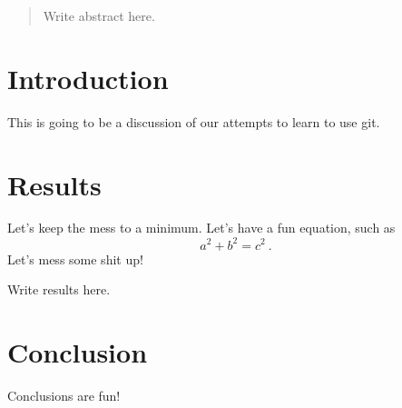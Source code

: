 \documentclass{article}
\begin{document}
\begin{abstract}
Write abstract here.
\end{abstract}

\section{Introduction}

This is going to be a discussion of our attempts to learn to use git.

\section{Results}

Let's keep the mess to a minimum.
Let's have a fun equation, such as
\begin{equation}
a^2 + b^2 = c^2~.
\end{equation}
Let's mess some shit up!

Write results here.

\section{Conclusion}

Conclusions are fun!
\end{document}

